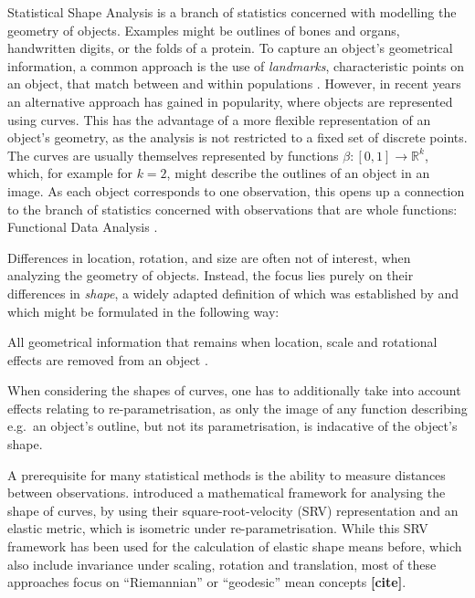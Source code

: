 Statistical Shape Analysis \parencite[see e.g.][]{DrydenMardia2016} is a branch of statistics concerned with modelling the geometry of objects.
Examples might be outlines of bones and organs, handwritten digits, or the folds of a protein.
To capture an object's geometrical information, a common approach is the use of \textit{landmarks}, characteristic points on an object, that match between and within populations \parencite[see][3]{DrydenMardia2016}.
However, in recent years an alternative approach has gained in popularity, where objects are represented using curves.
This has the advantage of a more flexible representation of an object's geometry, as the analysis is not restricted to a fixed set of discrete points.
The curves are usually themselves represented by functions $\beta : [0,1] \rightarrow \mathbb{R}^k$, which, for example for $k = 2$, might describe the outlines of an object in an image. 
As each object corresponds to one observation, this opens up a connection to the branch of statistics concerned with observations that are whole functions: Functional Data Analysis \parencite[see e.g.][]{RamsaySilverman2005}.

Differences in location, rotation, and size are often not of interest, when analyzing the geometry of objects.
Instead, the focus lies purely on their differences in  \textit{shape}, a widely adapted definition of which was established by \cite{Kendall1977} and which might be formulated in the following way:
\begin{definition}[Shape] 
    All geometrical information that remains when location, scale and rotational effects are removed from an object \parencite[see][1]{DrydenMardia2016}.
\end{definition}
\noindent When considering the shapes of curves, one has to additionally take into account effects relating to re-parametrisation, as only the image of any function describing e.g.\ an object's outline, but not its parametrisation, is indacative of the object's shape.

A prerequisite for many statistical methods is the ability to measure distances between observations.
\cite{SrivastavaEtAl2011} introduced a mathematical framework for analysing the shape of curves, by using their square-root-velocity (SRV) representation and an elastic metric, which is isometric under re-parametrisation.
While this SRV framework has been used for the calculation of elastic shape means before, which also include invariance under scaling, rotation and translation, most of these approaches focus on \enquote{Riemannian} or \enquote{geodesic} mean concepts \textbf{[cite]}.

